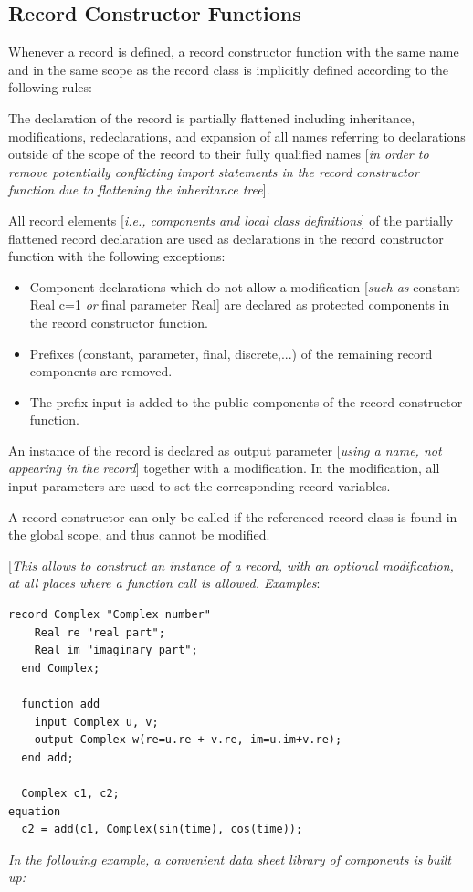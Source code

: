 \documentclass[10pt,a4paper]{report}
\def\doublelabel#1{\label{#1}}
\begin{document}
\subsection{Record Constructor Functions}\doublelabel{record-constructor-functions}

Whenever a record is defined, a record constructor function with the
same name and in the same scope as the record class is implicitly
defined according to the following rules:

The declaration of the record is partially flattened including
inheritance, modifications, redeclarations, and expansion of all names
referring to declarations outside of the scope of the record to their
fully qualified names {[}\emph{in order to remove potentially
conflicting import statements in the record constructor function due to
flattening the inheritance tree}{]}.

All record elements {[}\emph{i.e., components and local class
definitions}{]} of the partially flattened record declaration are used
as declarations in the record constructor function with the following
exceptions:

\begin{itemize}
\item
  Component declarations which do not allow a modification {[}\emph{such
  as} constant Real c=1 \emph{or} final parameter Real{]} are declared
  as protected components in the record constructor function.
\item
  Prefixes (constant, parameter, final, discrete,...) of the remaining
  record components are removed.
\item
  The prefix input is added to the public components of the record
  constructor function.
\end{itemize}

An instance of the record is declared as output parameter {[}\emph{using
a name, not appearing in the record}{]} together with a modification. In
the modification, all input parameters are used to set the corresponding
record variables.

A record constructor can only be called if the referenced record class
is found in the global scope, and thus cannot be modified.

{[}\emph{This allows to construct an instance of a record, with an
optional modification, at all places where a function call is allowed.
Examples}:

\begin{lstlisting}[language=modelica]
  record Complex "Complex number"
    Real re "real part";
    Real im "imaginary part";
  end Complex;

  function add
    input Complex u, v;
    output Complex w(re=u.re + v.re, im=u.im+v.re);
  end add;

  Complex c1, c2;
equation
  c2 = add(c1, Complex(sin(time), cos(time));
\end{lstlisting}
\emph{In the following example, a convenient data sheet library of
components is built up:}
\end{document}
